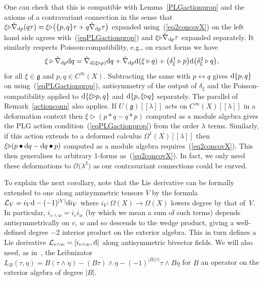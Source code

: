 \documentclass[10pt,a4paper]{amsart}
\numberwithin{equation}{section}
\newcommand{\<}{{\langle}}
\renewcommand{\>}{{\rangle}}
\newcommand{\CL}{{\mathcal{L}}}
\newcommand{\extd}{{\rm d}}
\newcommand{\la}{{\triangleright}}
\newcommand{\cg}{{\mathfrak{g}}}
\begin{document}
\begin{Remark}\label{remomegaXcov} One can check that this is compatible with Lemma~\ref{PLGactionprop} and the axioms of a contravariant connection in the sense that $\xi\la\hat\nabla_{\extd p}(q\tau)=\xi\la\big(\{p,q\}\tau+q\hat\nabla_{\extd p}\tau\big)$ expanded using~(\ref{eq2concovX}) on the left hand side agrees with~(\ref{eqPLGactionprop}) and $\xi\la\hat\nabla_{\extd p}\tau$ expanded separately. It similarly respects Poisson-compatibility, e.g., on exact forms we have
\begin{equation*}%
\xi\triangleright\hat{\nabla}_{\extd p}\extd q=\hat{\nabla}_{\extd(\xi\triangleright p)} \extd q+\hat{\nabla}_{\extd p}\extd(\xi\triangleright q)+\big(\delta_\xi^1\triangleright p\big)\extd\big(\delta_\xi^2\triangleright q\big), \end{equation*}
for all $\xi\in\cg$ and $p,q\in C^\infty(X)$. Subtracting the same with $p\leftrightarrow q$ gives $\extd\{p,q\}$ on using~(\ref{eqPLGactionprop}), antisymmetry of the output of $\delta_\xi$ and the Poisson-compatibility applied to $\extd\{\xi\la p,q\}$ and $\extd\{p,\xi\la q\}$ separately. The parallel of Remark~\ref{actionconn} also applies. If $U(\cg)[[\lambda]]$ acts on $C^\infty(X)[[\lambda]]$ in a deformation context then $\xi\la(p * q-q*p)$ computed as a module algebra gives the PLG action condition~(\ref{eqPLGactionprop}) from the order $\lambda$ terms. Similarly, if this action extends to a deformed calculus $\Omega^1(X)[[\lambda]]$ then $\xi\la(p\bullet\extd q-\extd q\bullet p)$ computed as a module algebra requires~(\ref{eq2concovX}). This then generalises to arbitrary 1-forms as~(\ref{eq2concovX}). In fact, we only need these deformations to $\mathcal{O}\big(\lambda^2\big)$ as our contravariant connections could be curved.
\end{Remark}


To explain the next corollary, note that the Lie derivative can be formally extended to one along antisymmetric tensors $V$ by the formula $\CL_V=i_V\extd -(-1)^{|V|} \extd i_V$ where $i_V\colon \Omega(X)\to \Omega(X)$ lowers degree by that of~$V$. In particular, $i_{v\wedge w}=i_v i_w$ (by which we mean a sum of such terms) depends antisymmetrically on $v$, $w$ and so descends to the wedge product, giving a well-defined degree $-2$ interior product on the exterior algebra. This in turn defines a Lie derivative $\CL_{v\wedge w}=[i_{v\wedge w},\extd]$ along antisymmetric bivector fields. We will also need, as in~\cite{Ma:rec}, the Leibnizator $L_B(\tau,\eta)=B(\tau\wedge\eta)-(B\tau)\wedge\eta-(-1)^{|B||\tau|}\tau\wedge B\eta$ for $B$ an operator on the exterior algebra of degree $|B|$.
\end{document}
